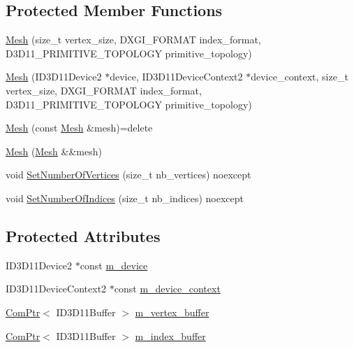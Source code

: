 \subsection*{Protected Member Functions}
\begin{DoxyCompactItemize}
\item 
\hyperlink{classmage_1_1_mesh_a1e61f6254fab6af510d40c437bc2922b}{Mesh} (size\+\_\+t vertex\+\_\+size, D\+X\+G\+I\+\_\+\+F\+O\+R\+M\+AT index\+\_\+format, D3\+D11\+\_\+\+P\+R\+I\+M\+I\+T\+I\+V\+E\+\_\+\+T\+O\+P\+O\+L\+O\+GY primitive\+\_\+topology)
\item 
\hyperlink{classmage_1_1_mesh_ac44a91f00e7cd9d4a4566c5d836ab6d7}{Mesh} (I\+D3\+D11\+Device2 $\ast$device, I\+D3\+D11\+Device\+Context2 $\ast$device\+\_\+context, size\+\_\+t vertex\+\_\+size, D\+X\+G\+I\+\_\+\+F\+O\+R\+M\+AT index\+\_\+format, D3\+D11\+\_\+\+P\+R\+I\+M\+I\+T\+I\+V\+E\+\_\+\+T\+O\+P\+O\+L\+O\+GY primitive\+\_\+topology)
\item 
\hyperlink{classmage_1_1_mesh_a1627e85c72d10bdedbfbf746b108cc73}{Mesh} (const \hyperlink{classmage_1_1_mesh}{Mesh} \&mesh)=delete
\item 
\hyperlink{classmage_1_1_mesh_a2751abe4790ca150f1fcc285504645ae}{Mesh} (\hyperlink{classmage_1_1_mesh}{Mesh} \&\&mesh)
\item 
void \hyperlink{classmage_1_1_mesh_abdb9050ecea85108b1e890a68aa5b656}{Set\+Number\+Of\+Vertices} (size\+\_\+t nb\+\_\+vertices) noexcept
\item 
void \hyperlink{classmage_1_1_mesh_a87ddba20dbdc57b168d38b02e7ccfdd0}{Set\+Number\+Of\+Indices} (size\+\_\+t nb\+\_\+indices) noexcept
\end{DoxyCompactItemize}
\subsection*{Protected Attributes}
\begin{DoxyCompactItemize}
\item 
I\+D3\+D11\+Device2 $\ast$const \hyperlink{classmage_1_1_mesh_ad1d91b6048d73bb05d0d39028d048f18}{m\+\_\+device}
\item 
I\+D3\+D11\+Device\+Context2 $\ast$const \hyperlink{classmage_1_1_mesh_a1d19b5bceea2256f4d80ebc06fa74f00}{m\+\_\+device\+\_\+context}
\item 
\hyperlink{namespacemage_ae74f374780900893caa5555d1031fd79}{Com\+Ptr}$<$ I\+D3\+D11\+Buffer $>$ \hyperlink{classmage_1_1_mesh_af5ae74887eb330201829477cf772ba6e}{m\+\_\+vertex\+\_\+buffer}
\item 
\hyperlink{namespacemage_ae74f374780900893caa5555d1031fd79}{Com\+Ptr}$<$ I\+D3\+D11\+Buffer $>$ \hyperlink{classmage_1_1_mesh_abe29363ebac77b284ca69532fd5b3373}{m\+\_\+index\+\_\+buffer}
\end{DoxyCompactItemize}
